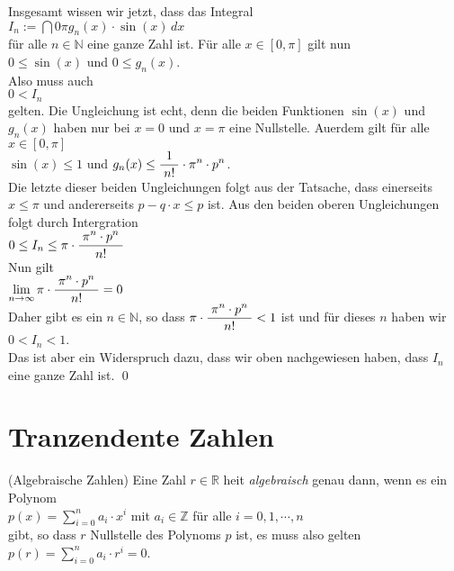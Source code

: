 Insgesamt wissen wir jetzt, dass das Integral
\\[0.2cm]
\hspace*{1.3cm}
$I_n := \dint{0}{{\pi}} g_n(x) \cdot \sin(x)\, dx$
\\[0.2cm]
f\"ur alle $n \in \mathbb{N}$ eine ganze Zahl ist.  F\"ur alle $x \in [0, \pi]$ gilt nun
\\[0.2cm]
\hspace*{1.3cm}
$0 \leq \sin(x)$ \quad und \quad $0 \leq g_n(x)$.
\\[0.2cm]
Also muss auch
\\[0.2cm]
\hspace*{1.3cm}
$0 < I_n$
\\[0.2cm]
gelten.  Die Ungleichung ist echt, denn die beiden Funktionen $\sin(x)$ und $g_n(x)$ haben
nur bei $x = 0$ und $x = \pi$ eine Nullstelle.
Au\3erdem gilt f\"ur alle $x \in [0,\pi]$
\\[0.2cm]
\hspace*{1.3cm}
$\sin(x) \leq 1$ \quad und \quad $g_n(x) \leq \displaystyle\frac{\;\displaystyle1\;}{\;\displaystyle n!\;} \cdot \pi^n \cdot p^n$.
\\[0.2cm]
Die letzte dieser beiden Ungleichungen folgt aus der Tatsache, dass einerseits $x \leq \pi$ und andererseits
$p - q\cdot x \leq p$ ist.  Aus den beiden oberen Ungleichungen folgt durch Intergration
\\[0.2cm]
\hspace*{1.3cm}
$0 \leq I_n \leq \pi \cdot \displaystyle\frac{\;\displaystyle\pi^n \cdot p^n\;}{\;\displaystyle n!\;}$
\\[0.2cm]
Nun gilt
\\[0.2cm]
\hspace*{1.3cm}
$\lim\limits_{n \rightarrow \infty} \pi \cdot \displaystyle\frac{\;\displaystyle\pi^n \cdot p^n\;}{\;\displaystyle n!\;} = 0$
\\[0.2cm]
Daher gibt es ein $n \in \mathbb{N}$, so dass $\pi \cdot \displaystyle\frac{\;\displaystyle\pi^n \cdot p^n\;}{\;\displaystyle n!\;} < 1$ ist und f\"ur dieses
$n$ haben wir 
\\[0.2cm]
\hspace*{1.3cm}
$0 < I_n < 1$.
\\[0.2cm]
Das ist aber ein Widerspruch dazu, dass wir oben nachgewiesen haben, dass $I_n$ eine ganze Zahl ist.  \qed

\section{Tranzendente Zahlen}
\begin{Definition}(Algebraische Zahlen) \lb
Eine Zahl $r \in \mathbb{R}$ hei\3t \emph{algebraisch} genau dann, wenn es ein Polynom
\\[0.2cm]
\hspace*{1.3cm}
$p(x) = \sum\limits_{i=0}^n a_i \cdot x^i$  \quad mit $a_i \in \mathbb{Z}$ f\"ur alle $i = 0, 1, \cdots, n$
\\[0.2cm]
gibt, so dass $r$ Nullstelle des Polynoms $p$ ist, es muss also gelten
\\[0.2cm]
\hspace*{1.3cm}
$p(r) = \sum\limits_{i=0}^n a_i \cdot r^i = 0$.  \eod
\end{Definition}

